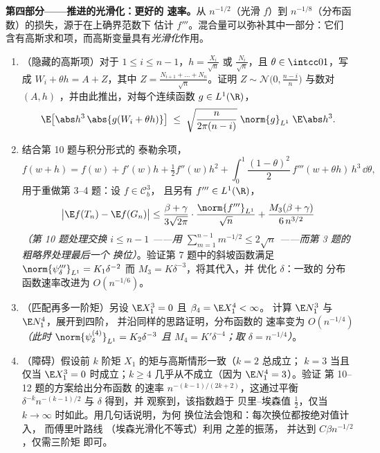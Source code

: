 \begin{problem}
\medskip
\noindent\textbf{第四部分——推进的光滑化：更好的
速率。}从 $n^{-1/2}$（光滑 $f$）到
$n^{-1/8}$（分布函数）的损失，源于在上确界范数下
估计 $f'''$。混合量可以弥补其中一部分：它们
含有高斯求和项，而高斯变量具有\emph{光滑化}作用。
\begin{enumerate}[resume]
  \item （隐藏的高斯项）对于 $1 \leq i \leq n - 1$，$h =
        \frac{X_i}{\sqrt n}$ 或 $\frac{N_i}{\sqrt n}$，且
        $\theta \in \intcc01$，写成 $W_i + \theta h = A +
        Z$，其中 $Z = \frac{N_{i+1} + \dots + N_n}{\sqrt
        n}$。证明 $Z \sim \mathcal N\bigl(0,
        \frac{n-i}n\bigr)$ 与数对 $(A,
        h)$ ，并由此推出，对每个连续函数 $g \in
        L^1(\R)$，
        \[
        \E\bigl[\abs h^3\,\abs{g(W_i + \theta h)}\bigr]
        \;\leq\; \sqrt{\frac{n}{2\pi(n - i)}}\;
        \norm{g}_{L^1}\;\E\abs h^3 .
        \]
  \item 结合第 10 题与积分形式的
        泰勒余项，
        \[
        f(w + h) = f(w) + f'(w)h + \tfrac12f''(w)h^2 +
        \int_0^1\frac{(1 - \theta)^2}2\,f'''(w + \theta
        h)\,h^3\,\dd\theta,
        \]
        用于重做第 3--4 题：设 $f \in \mathcal C^3_b$，
        且另有 $f''' \in L^1(\R)$，
        \[
        \bigl|\E f(T_n) - \E f(G_n)\bigr| \leq
        \frac{\beta + \gamma}{3\sqrt{2\pi}}\cdot
        \frac{\norm{f'''}_{L^1}}{\sqrt n} +
        \frac{M_3(\beta + \gamma)}{6\,n^{3/2}}
        \]
        \emph{（第 10 题处理交换 $i \leq n - 1$
——用 $\sum_{m=1}^{n-1}m^{-1/2} \leq 2\sqrt n$
——而第 3 题的粗略界处理最后一个
        换位）}。验证第 7 题中的斜坡函数满足
        $\norm{\psi_\delta'''}_{L^1} = K_1\delta^{-2}$
        而 $M_3 = K\delta^{-3}$，将其代入，并
        优化 $\delta$：一致的
        分布函数速率改进为
        $O(n^{-1/6})$。
  \item （匹配再多一阶矩）另设 $\E
        X_1^3 = 0$ 且 $\beta_4 = \E X_1^4 < \infty$。
        计算 $\E N_1^3$ 与 $\E N_1^4$，展开到四阶，
        并沿同样的思路证明，分布函数的
        速率变为 $O(n^{-1/4})$
        \emph{（此时 $\norm{\psi_\delta^{(4)}}_{L^1} =
        K_2\delta^{-3}$ 且 $M_4 = K'\delta^{-4}$；取
        $\delta = n^{-1/4}$）}。
  \item （障碍）假设前 $k$ 阶矩
        $X_1$ 的矩与高斯情形一致（$k = 2$ 总成立；
        $k = 3$ 当且仅当 $\E X_1^3 = 0$ 时成立；$k \geq 4$
        几乎从不成立（因为 $\E N_1^4 = 3$）。验证
        第 10--12 题的方案给出分布函数
        的速率
        $n^{-(k-1)/(2k+2)}$，这通过平衡
        $\delta^{-k}n^{-(k-1)/2}$ 与 $\delta$ 得到，并
        观察到，该指数趋于
        贝里--埃森值 $\frac12$，仅当 $k \to
        \infty$ 时如此。用几句话说明，为何
        换位法会饱和：每次换位都按绝对值计入，
        而傅里叶路线
        （埃森光滑化不等式）利用
        之差的振荡，
        并达到 $C\beta n^{-1/2}$，仅需三阶矩
        即可。
\end{enumerate}


\end{problem}
